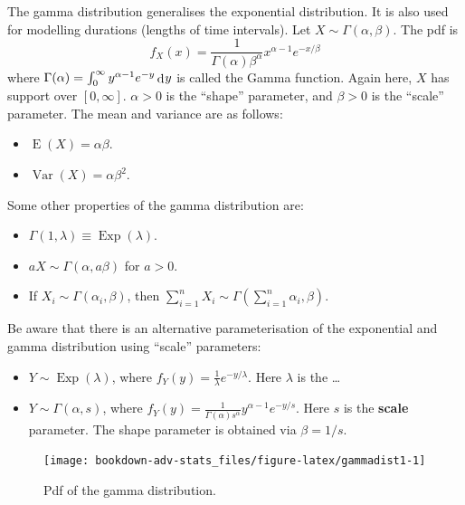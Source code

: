 \documentclass[
]{book}
\providecommand{\tightlist}{%
  \setlength{\itemsep}{0pt}\setlength{\parskip}{0pt}}
\DeclareMathOperator{\E}{E}
\DeclareMathOperator{\Var}{Var}
\DeclareMathOperator{\Exp}{Exp}
\DeclareMathOperator{\dd}{d}
\newcommand{\dint}{\dd\hspace{0.5pt}\!}
\theoremstyle{definition}
\theoremstyle{definition}
\theoremstyle{definition}
\theoremstyle{definition}
\theoremstyle{remark}
\begin{document}
The gamma distribution generalises the exponential distribution.
It is also used for modelling durations (lengths of time intervals).
Let \(X\sim\Gamma(\alpha,\beta)\).
The pdf is
\[
  f_X(x) = \frac{1}{\Gamma(\alpha)\beta^\alpha} x^{\alpha-1} e^{- x/\beta}
\]
where \(\Gamma(\alpha)=\int_0^\infty y^{\alpha-1}e^{-y}\dint y\) is called the Gamma function.
Again here, \(X\) has support over \([0,\infty]\).
\(\alpha>0\) is the ``shape'' parameter, and \(\beta >0\) is the ``scale'' parameter.
The mean and variance are as follows:

\begin{itemize}
\tightlist
\item
  \(\E(X)=\alpha\beta\).
\item
  \(\Var(X)=\alpha\beta^2\).
\end{itemize}

Some other properties of the gamma distribution are:

\begin{itemize}
\tightlist
\item
  \(\Gamma(1,\lambda) \equiv \Exp(\lambda)\).
\item
  \(aX\sim\Gamma(\alpha,a\beta)\) for \(a>0\).
\item
  If \(X_i\sim\Gamma(\alpha_i,\beta)\), then \(\sum_{i=1}^n X_i \sim \Gamma(\sum_{i=1}^n \alpha_i,\beta)\).
\end{itemize}

Be aware that there is an alternative parameterisation of the exponential and gamma distribution using ``scale'' parameters:

\begin{itemize}
\tightlist
\item
  \(Y \sim \Exp(\lambda)\), where \(f_Y(y)=\frac{1}{\lambda}e^{-y/\lambda}\). Here \(\lambda\) is the \ldots{}
\item
  \(Y \sim \Gamma(\alpha,s)\), where \(f_Y(y)=\frac{1}{\Gamma(\alpha)s^\alpha} y^{\alpha-1} e^{-y/s}\). Here \(s\) is the \textbf{scale} parameter. The shape parameter is obtained via \(\beta=1/s\).
\end{itemize}

\begin{figure}

{\centering \texttt{[image: bookdown-adv-stats\_files/figure-latex/gammadist1-1]} 

}

\caption{Pdf of the gamma distribution.}\label{fig:gammadist1}
\end{figure}
\end{document}
